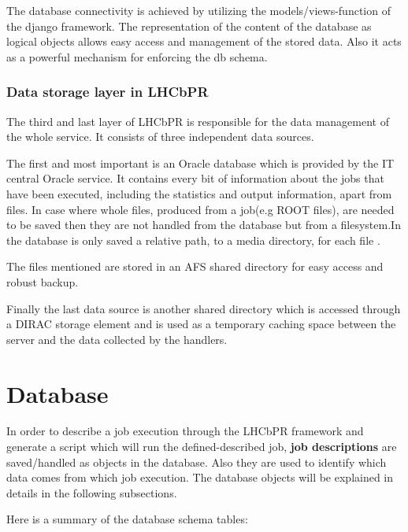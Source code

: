 \documentclass{lhcbnote}
\begin{document}
The database connectivity is achieved by utilizing the models/views-function of the django framework. The representation of the content of the database as logical 
objects allows easy access and management of the stored data. Also it acts as a powerful mechanism for enforcing the db schema.


\subsubsection{Data storage layer in LHCbPR}

The third and last layer of LHCbPR is responsible for the data management of the whole service. It consists of three independent data sources. 

The first and most important is an Oracle database which is provided by the IT central Oracle service. It contains every bit of information about the jobs that 
have been executed, including the statistics and output information, apart from files. In case where whole files, produced from a job(e.g ROOT files), 
are needed to be saved then they are not handled from the database but from a filesystem.In the database is only saved a relative path, to a media directory, for each file .

The files mentioned are stored in an AFS shared directory for easy access and robust backup. 

Finally the last data source is another shared directory which is accessed through a DIRAC storage element and is used as a temporary caching space between the 
server and the data collected by the handlers. 


\section{Database}

In order to describe a job execution through the LHCbPR framework and generate a script which will run the defined-described job, {\bf job descriptions} are saved/handled as objects 
in the database. Also they are used to identify which data comes from which job execution. The database objects will be explained in details in the following subsections.

\vspace{4 mm}

Here is a summary of the database schema tables:

\vspace{4 mm}
\end{document}
